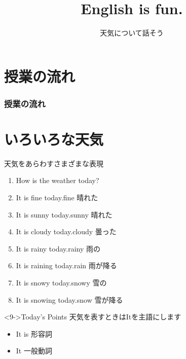 \documentclass[aspectratio=169,xcolor={dvipsnames,table}]{beamer}
\title{English is fun.}
\subtitle{天気について話そう}
\author{}
\institute[]{}
\date[]
\begin{document}
\begin{frame}[plain]
  \titlepage
\end{frame}

\section*{授業の流れ}
\begin{frame}[plain]
  \frametitle{授業の流れ}
  \tableofcontents
\end{frame}

\section{いろいろな天気}
\begin{frame}[plain]{天気をあらわすさまざまな表現}


\begin{enumerate}[<+->]
 \item How is the weather today?
 \item It is fine today.\hfill{\scriptsize fine   晴れた}
\item It is sunny today.\hfill{\scriptsize sunny   晴れた}
 \item It is cloudy today.\hfill{\scriptsize cloudy   曇った}
 \item It is rainy today.\hfill{\scriptsize rainy   雨の}
\item It is raining today.\hfill{\scriptsize rain   雨が降る}
  \item  It is snowy today.\hfill{\scriptsize snowy   雪の}
\item It is snowing today.\hfill{\scriptsize snow   雪が降る}
\end{enumerate}

\begin{block}<9->{Today's Points}\small
天気を表すときはItを主語にします
\begin{itemize}[square]\small
 \item It is 形容詞
 \item It 一般動詞
\end{itemize}
\end{block}
\hfill{\scriptsize {}}
\end{frame}
\end{document}
